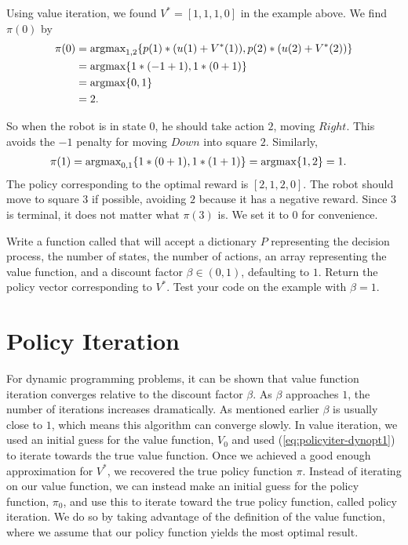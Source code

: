 Using value iteration, we found $V^*  = [1, 1, 1, 0]$ in the example above.
We find $\pi(0)$ by
\begin{align*}
\pi(0) &=\mbox{argmax}_{1,2} \{p(1)*(u(1) + V^*(1)), p(2)*(u(2)+V^*(2))\} \\
&= \mbox{argmax} \{1*(-1+1), 1*(0+1)\} \\
&= \mbox{argmax}\{0, 1\}\\
&= 2.
\end{align*}

So when the robot is in state $0$, he should take action $2$, moving $Right$.
This avoids the $-1$ penalty for moving $Down$ into square $2$.
Similarly, 
\begin{align*}
\pi(1) &= \mbox{argmax}_{0,1} \{1*(0+1), 1*(1+1)\} = \mbox{argmax} \{1, 2\} = 1.
\end{align*}
The policy corresponding to the optimal reward is $[2,1,2,0]$.
The robot should move to square $3$ if possible, avoiding $2$ because it has a negative reward.
Since $3$ is terminal, it does not matter what $\pi(3)$ is.
We set it to $0$ for convenience.


\begin{problem}
\label{prob:policyiter-value2}
Write a function called  that will accept a dictionary $P$ representing the decision process, the number of states, the number of actions, an array representing the value function, and a discount factor $\beta \in (0,1)$, defaulting to $1$.
Return the policy vector corresponding to $V^*$.
Test your code on the example with $\beta = 1$.
\end{problem}

\section*{Policy Iteration}
For dynamic programming problems, it can be shown that value function iteration converges relative to the discount factor $\beta$.
As $\beta$ approaches $1$, the number of iterations increases dramatically.
As mentioned earlier $\beta$ is usually close to $1$, which means this algorithm can converge slowly.
In value iteration, we used an initial guess for the value function, $V_0$ and used (\ref{eq:policyiter-dynopt1}) to iterate towards the true value function.
Once we achieved a good enough approximation for $V^*$, we recovered the true policy function $\pi$.
Instead of iterating on our value function, we can instead make an initial guess for the policy function, $\pi_0$, and use this to iterate toward the true policy function, called policy iteration.
We do so by taking advantage of the definition of the value function, where we assume that our policy function yields the most optimal result.

